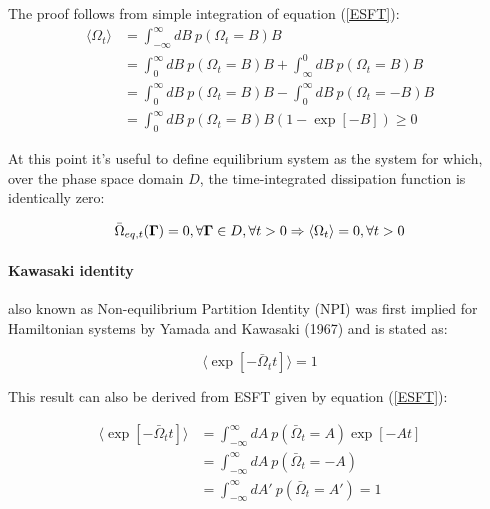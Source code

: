 \documentclass[a4paper,12pt]{article}
\begin{document}
 The proof follows from simple integration of equation (\ref{ESFT}):
\begin{equation}
\begin{aligned}
  \langle \Omega_t \rangle &= \int_{-\infty}^{\infty} dB\ p(\Omega_t=B)B\\
  &=\int_0^{\infty} dB\ p(\Omega_t=B)B +\int_{\infty}^{0} dB\ p(\Omega_t=B)B \\
  &=\int_0^{\infty} dB\ p(\Omega_t=B)B -\int_{0}^{\infty} dB\ p(\Omega_t=-B)B \\
  &= \int_0^{\infty} dB\ p(\Omega_t=B)B(1-\exp[-B]) \geq 0 
\end{aligned}
\end{equation} 

At this point it's useful to define equilibrium system as the system for which, over the phase space domain $D$, the time-integrated dissipation function is identically zero:

\begin{equation}
  \bar{\Omega}_{eq,t}(\bm{\Gamma})=0, \forall\bm{\Gamma}\in  D, \forall t >0 \\
  \Rightarrow \langle \Omega_t \rangle = 0, \forall t > 0
\end{equation}


\paragraph{Kawasaki identity}

also known as Non-equilibrium Partition Identity (NPI) was first implied for Hamiltonian systems by Yamada and Kawasaki (1967)\cite{Yamada:1967uo} and is stated as:

\begin{equation}
  \langle \exp[-\bar{\Omega}_t t] \rangle =1
\end{equation}

This result can also be derived from ESFT given by equation (\ref{ESFT}):

\begin{equation}
\begin{aligned}
  \langle \exp[-\bar{\Omega}_t t] \rangle &= \int_{-\infty}^{\infty} dA\ p(\bar{\Omega}_t=A)\exp[-A t]\\
  &=\int_{-\infty}^{\infty} dA\ p(\bar{\Omega}_t=-A)\\
  &=\int_{-\infty}^{\infty} dA'\ p(\bar{\Omega}_t=A')=1
\end{aligned}
\end{equation}
\end{document}
